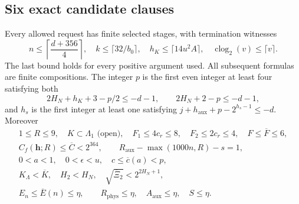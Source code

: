 \subsection{Six exact candidate clauses}
\begin{theorem}
\label{uda:clause-a}
Every allowed request has finite selected stages, with termination witnesses
\[
 n\le\left\lceil\frac{d+356}{4}\right\rceil,\quad
 k\le\lceil32/b_0\rceil,\quad
 h_K\le\lceil14u^2A\rceil,\quad
 \operatorname{clog}_2(v)\le\lceil v\rceil.
\]
The last bound holds for every positive argument used. All subsequent
formulas are finite compositions. The integer $p$ is the first even
integer at least four satisfying both
\[
 2H_N+h_K+3-p/2\le-d-1,\qquad2H_N+2-p\le-d-1,
\]
and $h_s$ is the first integer at least one satisfying
$j+h_{\mathrm{aux}}+p-2^{h_s-1}\le-d$. Moreover
\begin{gather*}
 1\le R\le9,\quad K\subset\Lambda_1\text{ (open)},\quad
 F_1\le4c_r\le8,\quad F_2\le2c_r\le4,\quad F\le\overline F\le6,\\
 C_f(\mathbf h;R)\le\overline C<2^{364},\qquad
 R_{\mathrm{aux}}-\max(1000n,R)-s=1,\\
 0<a<1,\quad0<\epsilon<u,\quad c\le\overline c(a)<p,\\
 K_\Lambda<\overline K,\quad H_2<H_N,\quad
 \sqrt{\overline\Xi_2}<2^{2H_N+1},\\
 E_n\le\overline E(n)\le\eta,\qquad
 R_{\mathrm{phys}}\le\eta,\quad A_{\mathrm{aux}}\le\eta,\quad S\le\eta.
\end{gather*}
\end{theorem}

